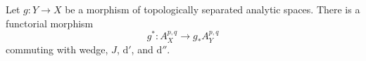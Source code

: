 \begin{proposition}
\label{prop:cld-form-pullback}
Let $g:Y\to X$ be a morphism of topologically separated analytic spaces.
There is a functorial morphism
\[
                 g^*:A_X^{p,q}\longrightarrow g_*A_Y^{p,q}
\]
commuting with wedge, $J$, $\mathrm d'$, and $\mathrm d''$.
\end{proposition}

